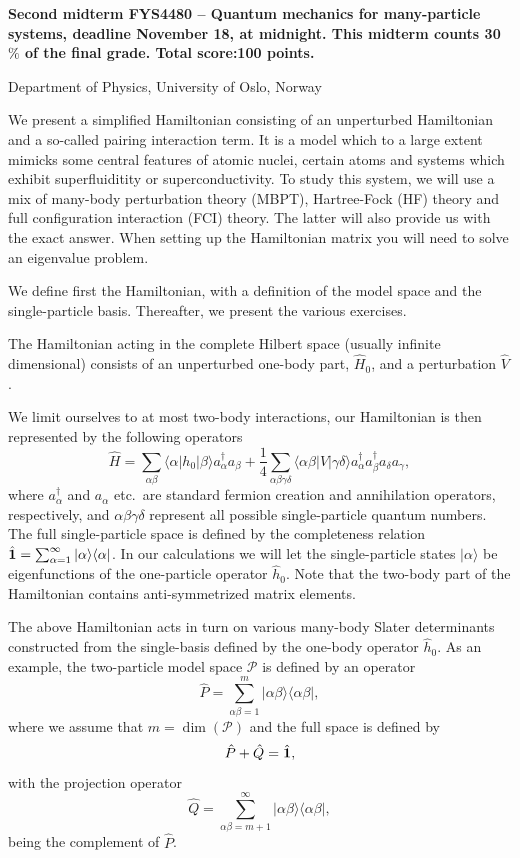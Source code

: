 \documentclass[prc]{revtex4} \usepackage[dvips]{graphicx}
\begin{document}
\begin{center}
{\LARGE\bf
Second midterm FYS4480 – Quantum mechanics for many-particle systems, deadline November 18, at midnight. This midterm counts 30$\%$ of the final grade. Total score:100 points.}
\end{center}
\begin{center}
\centerline{{\small Department of Physics, University of Oslo, Norway}}
\end{center}


We present a simplified Hamiltonian consisting of an unperturbed
Hamiltonian and a so-called pairing interaction term. It is a model
which to a large extent mimicks some central features of atomic
nuclei, certain atoms and systems which exhibit superfluiditity or
superconductivity.  To study this system, we will use a mix of
many-body perturbation theory (MBPT), Hartree-Fock (HF) theory and full
configuration interaction (FCI) theory. The latter will also provide us with
the exact answer.  When setting up the Hamiltonian matrix you will
need to solve an eigenvalue problem.

We define first the Hamiltonian, with a definition of the model space
and the single-particle basis. Thereafter, we present the various
exercises.


The Hamiltonian acting in the complete Hilbert space (usually infinite
dimensional) consists of an unperturbed one-body part, $\hat{H}_0$,
and a perturbation $\hat{V}$.

We limit ourselves to at most two-body interactions, our Hamiltonian
is then represented by the following operators
\[
\hat{H} = \sum_{\alpha\beta}\langle \alpha |h_0|\beta\rangle
a_{\alpha}^{\dagger}a_{\beta}
+\frac{1}{4}\sum_{\alpha\beta\gamma\delta}\langle \alpha\beta|
V|\gamma\delta\rangle
a_{\alpha}^{\dagger}a_{\beta}^{\dagger}a_{\delta}a_{\gamma},
\]
where $a_{\alpha}^{\dagger}$ and $a_{\alpha}$ etc.~are standard
fermion creation and annihilation operators, respectively, and
$\alpha\beta\gamma\delta$ represent all possible single-particle
quantum numbers.  The full single-particle space is defined by the
completeness relation $\hat{{\bf 1}} = \sum_{\alpha
  =1}^{\infty}|\alpha \rangle \langle \alpha|$.  In our calculations
we will let the single-particle states $|\alpha\rangle$ be
eigenfunctions of the one-particle operator $\hat{h}_0$. Note that the two-body part of the Hamiltonian 
contains anti-symmetrized matrix elements.


The above Hamiltonian acts in turn on various many-body Slater
determinants constructed from the single-basis defined by the one-body
operator $\hat{h}_0$.  As an example, the two-particle model space
$\mathcal{P}$ is defined by an operator
\[
\hat{P} = \sum_{\alpha\beta =1}^{m}|\alpha\beta \rangle \langle
\alpha\beta|,
\]
where we assume that $m=\dim(\mathcal{P})$ and the full space is
defined by
\[
\hat{P}+\hat{Q}=\hat{{\bf 1}},
\]
with the projection operator
\[
\hat{Q} = \sum_{\alpha\beta =m+1}^{\infty}|\alpha\beta \rangle \langle
\alpha\beta|,
\]
being the complement of $\hat{P}$.
\end{document}
